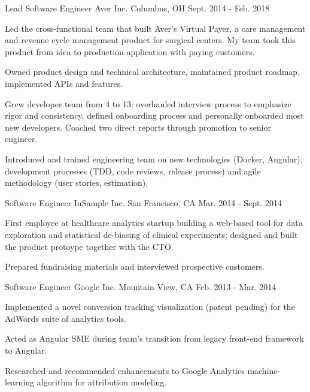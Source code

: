 \begin{cventries}
  \cventry
    {Lead Software Engineer} %
    {Aver Inc.} %
    {Columbus, OH} %
    {Sept. 2014 - Feb. 2018} %
    {
      \begin{cvitems} %
        \item {Led the cross-functional team that built Aver's Virtual Payer, a care management and revenue cycle management product for surgical centers.
        My team took this product from idea to production application with paying customers.}
        \item {Owned product design and technical architecture, maintained product roadmap, implemented APIs and features.}
        \item {Grew developer team from 4 to 13: overhauled interview process to emphasize rigor and consistency, defined onboarding process and personally onboarded most new developers. Coached two direct reports through promotion to senior engineer.}
        \item {Introduced and trained engineering team on new technologies (Docker, Angular), development processes (TDD, code reviews, release process) and agile methodology (user stories, estimation).}
      \end{cvitems}
    }

  \cventry
    {Software Engineer} %
    {InSample Inc.} %
    {San Francisco, CA} %
    {Mar. 2014 - Sept. 2014} %
    {
      \begin{cvitems} %
        \item {First employee at healthcare analytics startup building a web-based tool for data exploration and statistical de-biasing of clinical experiments; designed and built the product protoype together with the CTO.}
        \item {Prepared fundraising materials and interviewed prospective customers.}
      \end{cvitems}
    }

  \cventry
    {Software Engineer} %
    {Google Inc.} %
    {Mountain View, CA} %
    {Feb. 2013 - Mar. 2014} %
    {
      \begin{cvitems} %
        \item {Implemented a novel conversion tracking visualization (patent pending) for the AdWords suite of analytics tools.}
        \item {Acted as Angular SME during team’s transition from legacy front-end framework to Angular.}
        \item {Researched and recommended enhancements to Google Analytics machine-learning algorithm for attribution modeling.}
      \end{cvitems}
    }


\end{cventries}

